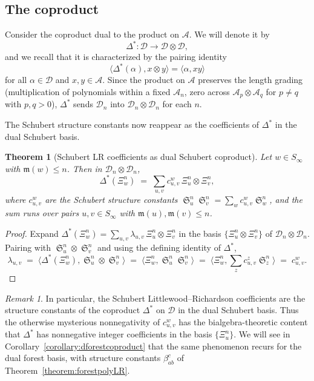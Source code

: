 \documentclass{amsart}
\newtheorem{theorem}{Theorem}[section]
\theoremstyle{definition}
\theoremstyle{remark}
\newtheorem*{remark}{Remark}
\numberwithin{equation}{subsection}
\DeclareMathOperator{\sch}{\mathfrak{S}}
\newcommand{\dsch}{\ensuremath{\Xi}}
\newcommand{\coma}{\mathcal{A}}
\newcommand{\dcoma}{\mathcal{D}}
\newcommand{\maxd}{\mathfrak{m}}
\begin{document}
\subsection{The coproduct}

Consider the coproduct dual to the product on $\coma$. We will denote it by
$$\Delta^*:\dcoma\to \dcoma\otimes\dcoma,$$
and we recall that it is characterized by the pairing identity
$$\langle \Delta^*(\alpha), x\otimes y\rangle = \langle \alpha, xy\rangle$$
for all $\alpha\in\dcoma$ and $x,y\in\coma$. Since the product on $\coma$ preserves the length grading (multiplication of polynomials within a fixed $\coma_n$, zero across $\coma_p\otimes\coma_q$ for $p\neq q$ with $p,q>0$), $\Delta^*$ sends $\dcoma_n$ into $\dcoma_n\otimes\dcoma_n$ for each $n$.

The Schubert structure constants now reappear as the coefficients of $\Delta^*$ in the dual Schubert basis.

\begin{theorem}[Schubert LR coefficients as dual Schubert coproduct]\label{theorem:dschcoproduct}
Let $w\in S_\infty$ with $\maxd(w)\leq n$. Then in $\dcoma_n\otimes\dcoma_n$,
$$\Delta^*(\dsch_w^n) \;=\; \sum_{u,v} c_{u,v}^w\, \dsch_u^n\otimes \dsch_v^n,$$
where $c_{u,v}^w$ are the Schubert structure constants $\sch_u^n\sch_v^n=\sum_w c_{u,v}^w\sch_w^n$, and the sum runs over pairs $u,v\in S_\infty$ with $\maxd(u),\maxd(v)\leq n$.
\end{theorem}
\begin{proof}
Expand $\Delta^*(\dsch_w^n) = \sum_{u,v}\lambda_{u,v}\,\dsch_u^n\otimes\dsch_v^n$ in the basis $\{\dsch_u^n\otimes\dsch_v^n\}$ of $\dcoma_n\otimes\dcoma_n$. Pairing with $\sch_u^n\otimes\sch_v^n$ and using the defining identity of $\Delta^*$,
$$\lambda_{u,v}\;=\;\langle \Delta^*(\dsch_w^n), \sch_u^n\otimes\sch_v^n\rangle\;=\;\langle \dsch_w^n,\sch_u^n\sch_v^n\rangle\;=\;\langle \dsch_w^n,\textstyle\sum_z c_{u,v}^z \sch_z^n\rangle\;=\;c_{u,v}^w.$$
\end{proof}

\begin{remark}
In particular, the Schubert Littlewood--Richardson coefficients are the structure constants of the coproduct $\Delta^*$ on $\dcoma$ in the dual Schubert basis. Thus the otherwise mysterious nonnegativity of $c_{u,v}^w$ has the bialgebra-theoretic content that $\Delta^*$ has nonnegative integer coefficients in the basis $\{\dsch_u^n\}$. We will see in Corollary~\ref{corollary:dforestcoproduct} that the same phenomenon recurs for the dual forest basis, with structure constants $\beta_{ab}^c$ of Theorem~\ref{theorem:forestpolyLR}.
\end{remark}
\end{document}
